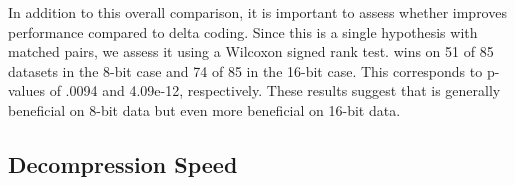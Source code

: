 In addition to this overall comparison, it is important to assess whether \fire improves performance compared to delta coding. Since this is a single hypothesis with matched pairs, we assess it using a Wilcoxon signed rank test. \fire wins on 51 of 85 datasets in the 8-bit case and 74 of 85 in the 16-bit case. This corresponds to p-values of .0094 and 4.09e-12, respectively. These results suggest that \fire is generally beneficial on 8-bit data but even more beneficial on 16-bit data.







\subsection{Decompression Speed} \label{sec:decomp_speed}

